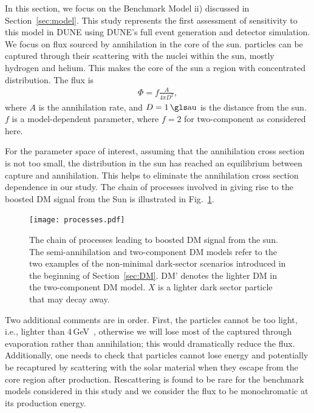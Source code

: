 In this section, we focus on the Benchmark Model ii) discussed in Section~\ref{sec:model}. This study represents the first assessment of sensitivity to this model in DUNE using DUNE's full event generation and detector simulation. We focus on  flux sourced by  annihilation in the core of the sun.  particles can be captured through their scattering with the nuclei within the sun, mostly hydrogen and helium. This makes the core of the sun a region with concentrated  distribution. The  flux is
\begin{eqnarray} \label{eq:fluxbdm}
\Phi= f \frac{A}{4\pi D^2},
\end{eqnarray}
where $A$ is the annihilation rate, and $D = 1\,\rm{\dword{au}}$ is the distance from the sun. $f$ is a model-dependent parameter, where $f = 2$ for two-component  as considered here.

For the parameter space of interest, %
assuming that the 
 annihilation cross section is not too small, the  distribution in the sun has reached an equilibrium between capture and annihilation. This helps to eliminate the annihilation cross section dependence in our study. The chain of processes involved in giving rise to the boosted DM signal from the Sun is illustrated in Fig.~\ref{fig:processes}.
\begin{figure}[h!]
  \centering
  \texttt{[image: processes.pdf]}
  \caption[Processes leading to boosted DM signal from the sun]{The chain of processes leading to boosted DM signal from the sun. The semi-annihilation and two-component DM models refer to the two examples of the non-minimal dark-sector scenarios introduced in the beginning of Section~\ref{sec:DM}. DM' denotes the lighter DM in the two-component DM model. $X$ is a lighter dark sector particle that may decay away.}
    \label{fig:processes}
\end{figure}

Two additional comments are in order. First, the  particles cannot be too light, i.e.,  lighter than 4\,GeV~\cite{Griest:1986yu,Gould:1987ju}, otherwise we will lose most of the captured  through evaporation rather than annihilation; this would dramatically reduce the  flux. Additionally, one needs to check that  particles cannot lose energy and potentially be recaptured by scattering with the solar material when they escape from the core region after production. Rescattering is found to be rare for the benchmark models considered in this study and we consider the  flux to be monochromatic at its production energy.

